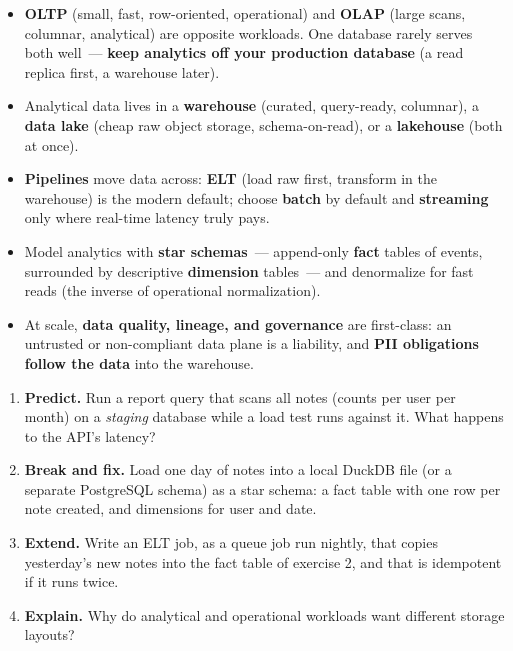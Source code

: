 \label{42-data-analytics-plane:key-takeaways}
\begin{takeaways}

\begin{itemize}
\tightlist
\item
  \textbf{OLTP} (small, fast, row-oriented, operational) and \textbf{OLAP} (large scans, columnar, analytical) are opposite workloads. One database rarely serves both well~--- \textbf{keep analytics off your production database} (a read replica first, a warehouse later).
\item
  Analytical data lives in a \textbf{warehouse} (curated, query-ready, columnar), a \textbf{data lake} (cheap raw object storage, schema-on-read), or a \textbf{lakehouse} (both at once).
\item
  \textbf{Pipelines} move data across: \textbf{ELT} (load raw first, transform in the warehouse) is the modern default; choose \textbf{batch} by default and \textbf{streaming} only where real-time latency truly pays.
\item
  Model analytics with \textbf{star schemas}~--- append-only \textbf{fact} tables of events, surrounded by descriptive \textbf{dimension} tables~--- and denormalize for fast reads (the inverse of operational normalization).
\item
  At scale, \textbf{data quality, lineage, and governance} are first-class: an untrusted or non-compliant data plane is a liability, and \textbf{PII obligations follow the data} into the warehouse.
\end{itemize}

\end{takeaways}

\label{42-data-analytics-plane:exercises}

\begin{enumerate}
\def\labelenumi{\arabic{enumi}.}
\tightlist
\item
  \textbf{Predict.} Run a report query that scans all notes (counts per user per month) on a \emph{staging} database while a load test runs against it. What happens to the API's latency?
\item
  \textbf{Break and fix.} Load one day of notes into a local DuckDB file (or a separate PostgreSQL schema) as a star schema: a fact table with one row per note created, and dimensions for user and date.
\item
  \textbf{Extend.} Write an ELT job, as a queue job run nightly, that copies yesterday's new notes into the fact table of exercise 2, and that is idempotent if it runs twice.
\item
  \textbf{Explain.} Why do analytical and operational workloads want different storage layouts?
\end{enumerate}

